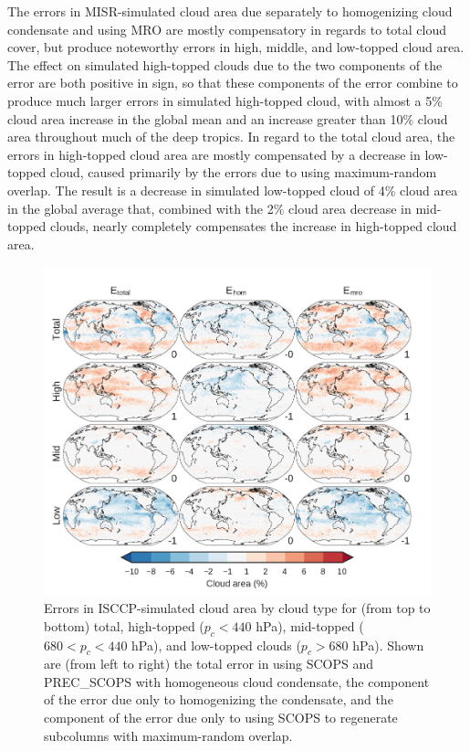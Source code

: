 The errors in MISR-simulated cloud area due separately to homogenizing
cloud condensate and using MRO are mostly compensatory in regards to
total cloud cover, but produce noteworthy errors in high, middle, and
low-topped cloud area. The effect on simulated high-topped clouds due to
the two components of the error are both positive in sign, so that these
components of the error combine to produce much larger errors in
simulated high-topped cloud, with almost a 5\% cloud area increase in
the global mean and an increase greater than 10\% cloud area throughout
much of the deep tropics. In regard to the total cloud area, the errors
in high-topped cloud area are mostly compensated by a decrease in
low-topped cloud, caused primarily by the errors due to using
maximum-random overlap. The result is a decrease in simulated low-topped
cloud of 4\% cloud area in the global average that, combined with the
2\% cloud area decrease in mid-topped clouds, nearly completely
compensates the increase in high-topped cloud area.

\begin{figure}[htbp]
\centering
\includegraphics{graphics/subgrid1_cldisccp_maps_diff.pdf}
\caption{\label{fig:subgrid1_cldisccp_errors}Errors in ISCCP-simulated
cloud area by cloud type for (from top to bottom) total, high-topped
(\(p_c < 440\) hPa), mid-topped (\(680 < p_c < 440\) hPa), and
low-topped clouds (\(p_c > 680\) hPa). Shown are (from left to right)
the total error in using SCOPS and PREC\_SCOPS with homogeneous cloud
condensate, the component of the error due only to homogenizing the
condensate, and the component of the error due only to using SCOPS to
regenerate subcolumns with maximum-random
overlap.}\label{fig:subgrid1ux5fcldisccpux5ferrors}
\end{figure}

